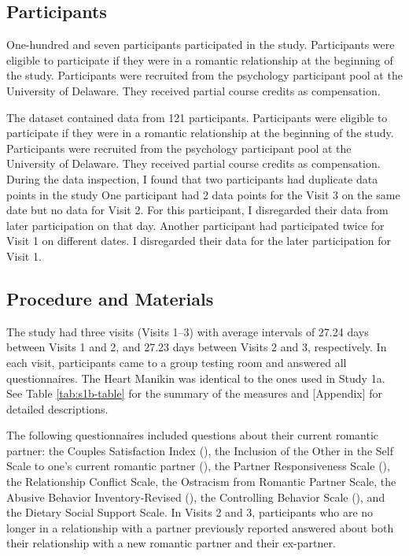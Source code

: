\documentclass[
]{udthesis}
\begin{document}
\subsection{Participants}\label{participants-1}

One-hundred and seven participants participated in the study.
Participants were eligible to participate if they were in a romantic
relationship at the beginning of the study. Participants were recruited
from the psychology participant pool at the University of Delaware. They
received partial course credits as compensation.

The dataset contained data from 121
participants. Participants were eligible to participate if they were in
a romantic relationship at the beginning of the study. Participants were
recruited from the psychology participant pool at the University of
Delaware. They received partial course credits as compensation. During
the data inspection, I found that two participants had duplicate data
points in the study One participant had 2 data points for the Visit 3 on
the same date but no data for Visit 2. For this participant, I
disregarded their data from later participation on that day. Another
participant had participated twice for Visit 1 on different dates. I
disregarded their data for the later participation for Visit 1.

\subsection{Procedure and Materials}\label{procedure-and-materials-1}

The study had three visits (Visits 1--3) with average intervals of
27.24 days between Visits 1 and 2, and
27.23 days between Visits 2 and 3,
respectively. In each visit, participants came to a group testing room
and answered all questionnaires. The Heart Manikin was identical to the
ones used in Study 1a. See Table \ref{tab:s1b-table} for the summary of
the measures and {[}Appendix{]} for detailed descriptions.

The following questionnaires included questions about their current
romantic partner: the Couples Satisfaction Index (), the Inclusion of the
Other in the Self Scale to one's current romantic partner (), the Partner
Responsiveness Scale (), the Relationship
Conflict Scale, the Ostracism from Romantic Partner Scale, the Abusive
Behavior Inventory-Revised (), the Controlling
Behavior Scale (), and the Dietary
Social Support Scale. In Visits 2 and 3, participants who are no longer
in a relationship with a partner previously reported answered about both
their relationship with a new romantic partner and their ex-partner.
\end{document}
